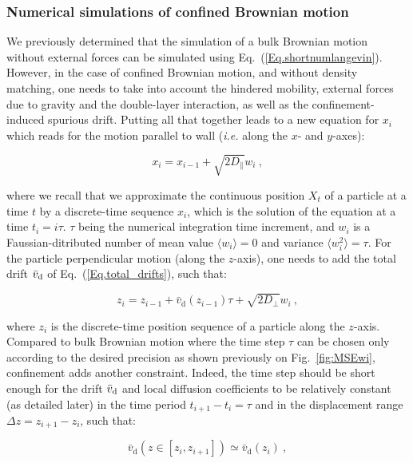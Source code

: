 \subsubsection{Numerical simulations of confined Brownian motion}

We previously determined that the simulation of a bulk Brownian motion without external forces can be simulated using Eq.~(\ref{Eq.shortnumlangevin}).
However, in the case of confined Brownian motion, and without density matching, one needs to take into account the hindered mobility, external forces due to gravity and the double-layer interaction, as well as the confinement-induced spurious drift. Putting all that together leads to a new equation for $x_i$ which reads for the motion parallel to wall (\textit{i.e.} along the $x$- and $y$-axes):

\begin{equation}
	x_i = x_{i-1} +  \sqrt{2D_\parallel}w_i ~,
	\label{eq.langevinnearx}
\end{equation}

where we recall that we approximate the continuous position $X_t$ of a particle at a time $t$ by a discrete-time sequence $x_i$, which is the solution of the equation at a time $t_i = i\tau$. $\tau$ being the numerical integration time increment, and $w_i$ is a Faussian-ditributed number of mean value $\langle w_i \rangle =0$ and variance $\langle w_i ^2\rangle = \tau$. For the particle perpendicular motion (along the $z$-axis), one needs to add the total drift $\bar{v}_\textnormal{d}$ of Eq.~(\ref{Eq.total_drifts}), such that:

\begin{equation}
	z_i = z_{i-1} + \bar{v}_\mathrm{d}(z_{i-1}) \tau + \sqrt{2D_\bot}w_i ~,
	\label{eq.langevinnearz}
\end{equation}

 where $z_i$ is the discrete-time position sequence of a particle along the $z$-axis. Compared to bulk Brownian motion where the time step $\tau$ can be chosen only according to the desired precision as shown previously on Fig.~\ref{fig:MSEwi}, confinement adds another constraint. Indeed, the time step should be short enough for the drift $\bar{v}_\textnormal{d}$ and local diffusion coefficients to be relatively constant (as detailed later) in the time period $t_{i+1} - t_i = \tau$ and in the displacement range $\Delta z = z_{i+1} - z_i$, such that:

\begin{equation}
	\bar{v}_\mathrm{d} (z \in [z_i, z_{i+1}]) \simeq \bar{v}_\mathrm{d} (z_i) ~,
	\label{driftc}
\end{equation}

